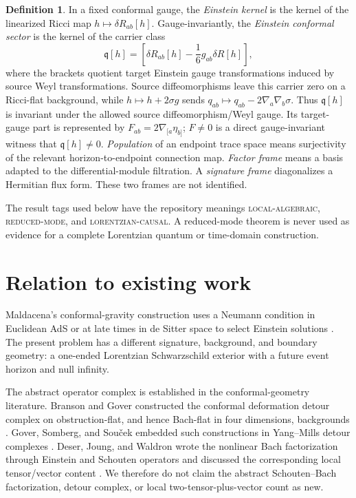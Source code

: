 \documentclass[11pt]{article}
\theoremstyle{definition}
\newtheorem{definition}[theorem]{Definition}
\theoremstyle{remark}
\begin{document}
\begin{definition}
In a fixed conformal gauge, the \emph{Einstein kernel} is the kernel of the
linearized Ricci map \(h\mapsto\delta R_{ab}[h]\).  Gauge-invariantly, the
\emph{Einstein conformal sector} is the kernel of the carrier class
\[
\mathfrak q[h]
=
\left[
\delta R_{ab}[h]-\frac16g_{ab}\delta R[h]
\right],
\]
where the brackets quotient target Einstein gauge transformations induced by
source Weyl transformations.  Source diffeomorphisms leave this carrier zero
on a Ricci-flat background, while \(h\mapsto h+2\sigma g\) sends
\(q_{ab}\mapsto q_{ab}-2\nabla_a\nabla_b\sigma\).  Thus
\(\mathfrak q[h]\) is invariant under the allowed source
diffeomorphism/Weyl gauge.  Its target-gauge part is represented by
\(F_{ab}=2\nabla_{[a}\eta_{b]}\); \(F\ne0\) is a direct gauge-invariant
witness that \(\mathfrak q[h]\ne0\).
\emph{Population} of an endpoint trace space means surjectivity of the
relevant horizon-to-endpoint connection map.
\emph{Factor frame} means a basis adapted to the differential-module
filtration.  A \emph{signature frame} diagonalizes a Hermitian flux form.
These two frames are not identified.
\end{definition}

The result tags used below have the repository meanings
\textsc{local-algebraic}, \textsc{reduced-mode}, and
\textsc{lorentzian-causal}.  A reduced-mode theorem is never used as evidence
for a complete Lorentzian quantum or time-domain construction.

\section{Relation to existing work}

Maldacena's conformal-gravity construction uses a Neumann condition in
Euclidean AdS or at late times in de Sitter space to select Einstein
solutions \cite{Maldacena}.  The present problem has a different signature,
background, and boundary geometry: a one-ended Lorentzian Schwarzschild
exterior with a future event horizon and null infinity.

The abstract operator complex is established in the conformal-geometry
literature.  Branson and Gover constructed the conformal deformation detour
complex on obstruction-flat, and hence Bach-flat in four dimensions,
backgrounds \cite{BransonGover}.  Gover, Somberg, and Sou\v cek embedded such
constructions in Yang--Mills detour complexes \cite{GoverSombergSoucek}.
Deser, Joung, and Waldron wrote the nonlinear Bach factorization through
Einstein and Schouten operators and discussed the corresponding local
tensor/vector content \cite{DeserJoungWaldron}.  We therefore do not claim
the abstract Schouten--Bach factorization, detour complex, or local
two-tensor-plus-vector count as new.
\end{document}

